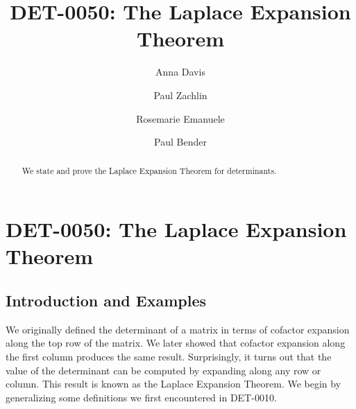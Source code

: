 \documentclass{ximera}
\author{Anna Davis \and Paul Zachlin \and Rosemarie Emanuele \and Paul Bender} \title{DET-0050: The Laplace Expansion Theorem} \license{CC-BY 4.0}
\begin{document}
\begin{abstract}
We state and prove the Laplace Expansion Theorem for determinants.
\end{abstract}
\maketitle


\section*{DET-0050: The Laplace Expansion Theorem}
\subsection*{Introduction and Examples}
We originally defined the determinant of a matrix in terms of cofactor expansion along the top row of the matrix.  We later showed that cofactor expansion along the first column produces the same result.  Surprisingly, it turns out that the value of the determinant can be computed by expanding along any row or column.  This result is known as the Laplace Expansion Theorem.  We begin by generalizing some definitions we first encountered in DET-0010.
\end{document}
